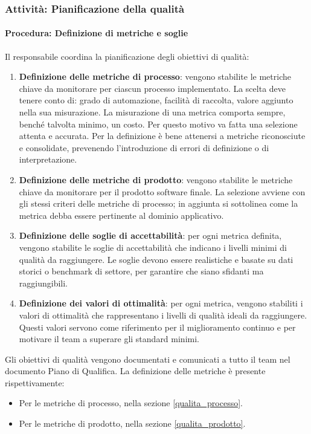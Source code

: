\documentclass[a4paper,12pt]{article}
\begin{document}
\subsubsection{Attività: Pianificazione della qualità}\label{pianificazione_qualita}

\paragraph{Procedura: Definizione di metriche e soglie}
Il responsabile coordina la pianificazione degli obiettivi di qualità:
\begin{enumerate}
    \item \textbf{Definizione delle metriche di processo}: vengono stabilite le metriche chiave da monitorare per ciascun processo implementato. La scelta deve tenere conto di: grado di automazione, facilità di raccolta, valore aggiunto nella sua misurazione. La misurazione di una metrica comporta sempre, benché talvolta minimo, un costo. Per questo motivo va fatta una selezione attenta e accurata. Per la definizione è bene attenersi a metriche riconosciute e consolidate, prevenendo l'introduzione di errori di definizione o di interpretazione.
    \item \textbf{Definizione delle metriche di prodotto}: vengono stabilite le metriche chiave da monitorare per il prodotto software finale. La selezione avviene con gli stessi criteri delle metriche di processo; in aggiunta si sottolinea come la metrica debba essere pertinente al dominio applicativo.
    \item \textbf{Definizione delle soglie di accettabilità}: per ogni metrica definita, vengono stabilite le soglie di accettabilità che indicano i livelli minimi di qualità da raggiungere. Le soglie devono essere realistiche e basate su dati storici o benchmark di settore, per garantire che siano sfidanti ma raggiungibili.
    \item \textbf{Definizione dei valori di ottimalità}: per ogni metrica, vengono stabiliti i valori di ottimalità che rappresentano i livelli di qualità ideali da raggiungere. Questi valori servono come riferimento per il miglioramento continuo e per motivare il team a superare gli standard minimi.
\end{enumerate}

Gli obiettivi di qualità vengono documentati e comunicati a tutto il team nel documento Piano di Qualifica.
La definizione delle metriche è presente rispettivamente:
\begin{itemize}
    \item Per le metriche di processo, nella sezione \ref{qualita_processo}.
    \item Per le metriche di prodotto, nella sezione \ref{qualita_prodotto}.
\end{itemize}
\end{document}
